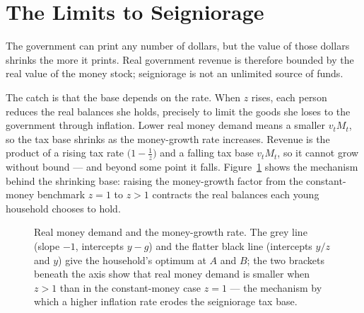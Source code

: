 \section{The Limits to Seigniorage}

The government can print any number of dollars, but the value of those dollars shrinks the more it prints. Real government revenue is therefore bounded by the real value of the money stock; seigniorage is not an unlimited source of funds.


The catch is that the base depends on the rate. When $z$ rises, each person reduces the real balances she holds, precisely to limit the goods she loses to the government through inflation. Lower real money demand means a smaller $v_t M_t$, so the tax base shrinks as the money-growth rate increases. Revenue is the product of a rising tax rate $\bigl(1-\tfrac1z\bigr)$ and a falling tax base $v_t M_t$, so it cannot grow without bound --- and beyond some point it falls. Figure~\ref{fig:money-5} shows the mechanism behind the shrinking base: raising the money-growth factor from the constant-money benchmark $z=1$ to $z>1$ contracts the real balances each young household chooses to hold.

\begin{figure}[h]
\centering

\caption{Real money demand and the money-growth rate. The grey line (slope $-1$, intercepts $y-g$) and the flatter black line (intercepts $y/z$ and $y$) give the household's optimum at $A$ and $B$; the two brackets beneath the axis show that real money demand is smaller when $z>1$ than in the constant-money case $z=1$ --- the mechanism by which a higher inflation rate erodes the seigniorage tax base.}
\label{fig:money-5}
\end{figure}


